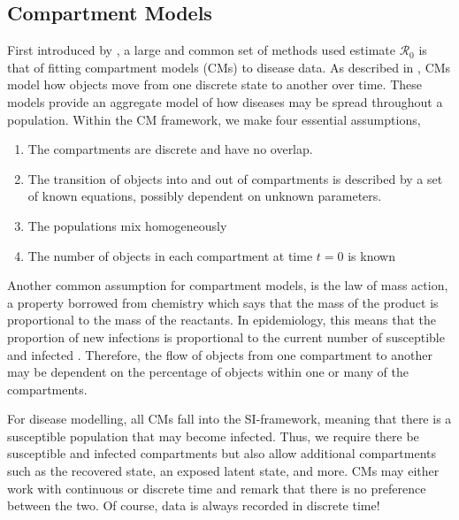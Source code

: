 \documentclass[12pt]{article}
\newcommand{\rr}{\ensuremath{\mathcal{R}_0}}
\begin{document}



\subsection{Compartment Models}
\label{sec:cms}

First introduced by \cite{Kermack700}, a large and common set of methods used estimate $\rr$ is that of fitting compartment models (CMs) to disease data.  As described in \cite{daley2001epidemic},  CMs model how objects move from one discrete state to another over time.  These models provide an aggregate model of how diseases may be spread throughout a population.  Within the CM framework, we make four essential assumptions,
\begin{enumerate}
\item The compartments are discrete and have no overlap.
\item The transition of objects into and out of compartments is described by a set of known equations, possibly dependent on unknown parameters.
\item The populations mix homogeneously
  \item The number of objects in each compartment at time $t=0$ is known
  \end{enumerate}  


Another common assumption for compartment models, is the law of mass action, a property borrowed from chemistry which says that the mass of the product is proportional to the mass of the reactants.  In epidemiology, this means that the proportion of new infections is proportional to the current  number of susceptible and infected \citep{anderson1992}.  Therefore, the flow of objects from one compartment to another may be dependent on the percentage of objects within one or many of the compartments. 

For disease modelling, all CMs fall into the SI-framework, meaning that there is a susceptible population that may become infected.  Thus, we require there be susceptible and infected compartments but also allow additional compartments such as the recovered state, an exposed latent state, and more.  CMs may either work with continuous or discrete time and \cite{getz2006} remark that there is no preference between the two.  Of course, data is always recorded in discrete time!
\end{document}
